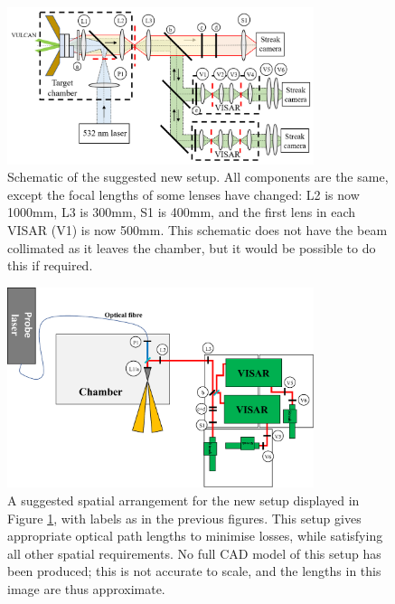 \begin{figure}
\begin{centering}
\includegraphics[width=0.8\textwidth]{figures/Experiment/SchematicsWithBackgrounds/ImprovedSchematic.png}%
\caption{\label{fig:SuggestedSchematic} Schematic of the suggested new setup. All components are the same, except the focal lengths of some lenses have changed: L2 is now 1000mm, L3 is 300mm, S1 is 400mm, and the first lens in each VISAR (V1) is now 500mm. This schematic does not have the beam collimated as it leaves the chamber, but it would be possible to do this if required.}
\end{centering}
\end{figure}

\begin{figure}
\begin{centering}
\includegraphics[width=0.8\textwidth]{figures/Experiment/ImprovedSetup.pdf}%
\caption{\label{fig:SuggestedSetup} A suggested spatial arrangement for the new setup displayed in Figure \ref{fig:SuggestedSchematic}, with labels as in the previous figures. This setup gives appropriate optical path lengths to minimise losses, while satisfying all other spatial requirements. No full CAD model of this setup has been produced; this is not accurate to scale, and the lengths in this image are thus approximate.}
\end{centering}
\end{figure}

